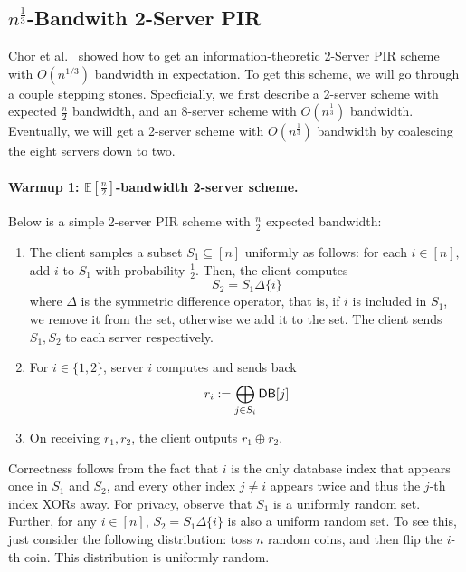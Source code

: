 \subsection{$n^{\frac{1}{3}}$-Bandwith 2-Server PIR} %
Chor et al.~\cite{chor1998private}
showed how to 
get an information-theoretic 2-Server PIR scheme
with $O(n^{1/3})$ bandwidth in expectation.
To get this scheme, we 
will go through a couple stepping stones. 
Specficially, we first 
describe a 2-server scheme 
with expected $\frac{n}{2}$ bandwidth, 
and an 8-server scheme with $O(n^{\frac 1 3})$ bandwidth. 
Eventually, we will get a 2-server scheme 
with $O(n^{\frac 1 3})$ bandwidth
by coalescing the 
eight servers down to two.

\paragraph{Warmup 1: $\mathbb{E}[\frac{n}{2}]$-bandwidth 2-server scheme.}
Below is a simple 2-server PIR scheme with 
$\frac{n}{2}$ expected bandwidth:
\begin{enumerate}
\item  
		The client samples 
a subset $S_{1} \subseteq [n]$ uniformly as follows: for each $i \in [n],$ add $i$ to $S_{1}$ with probability $\frac{1}{2}$. Then, the client computes
		\[S_{2} = S_{1} \Delta \{i\}\]
		where $\Delta$ is the symmetric difference operator, 
that is, if $i$ is included in $S_1$, we remove it from the set, otherwise we add it to the set. 
The client sends $S_{1},S_{2}$ to each server respectively.
\item 
For $i \in \{1, 2\}$, 
server $i$ computes and sends back
		\[r_{i} := \bigoplus_{j \in S_{i}} {\sf DB}[j]\]
\item 
		On receiving $r_1,r_2$, the client outputs $r_1 \oplus r_2$. 
\end{enumerate}
	
{Correctness} follows from the fact that $i$ is the only database 
index that appears once in $S_1$ and $S_2$, 
and every other index $j\neq i$ appears twice 
and thus the $j$-th index XORs away.
For privacy, 
observe 
that $S_1$ is a uniformly random set.
Further, for any $i \in [n]$, $S_2 = S_1 \Delta \{i\}$ 
is also a uniform random set. To see 
this, 
just consider the following distribution: toss 
$n$ random coins, and then flip the $i$-th coin. 
This distribution is uniformly random. %
        
